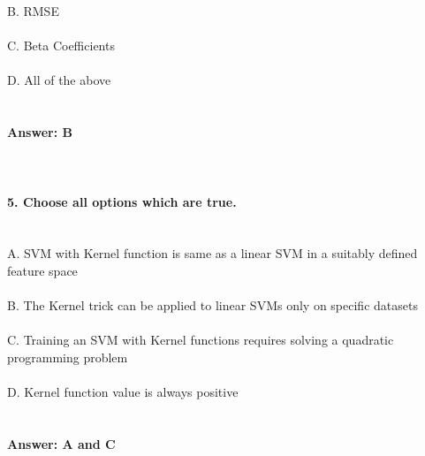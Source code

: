 \documentclass[prl,twocolumn,showpacs,preprintnumbers,superscriptaddress]{revtex4}
\theoremstyle{plain}
\theoremstyle{definition}
\begin{document}
\begin{widetext}
B. RMSE
\\
\\
C. Beta Coefficients
\\
\\
D. All of the above
\\
\\
\\
\textbf{Answer: B}
\\
\\
\\
\\
\textbf{5. Choose all options which are true.}
\\
\\
\\
\noindent A. SVM with Kernel function is same as a linear SVM in a suitably defined feature space
\\
\\
B. The Kernel trick can be applied to linear SVMs only on specific datasets
\\
\\
C. Training an SVM with Kernel functions requires solving a quadratic programming problem
\\
\\
D. Kernel function value is always positive
\\
\\
\\
\textbf{Answer: A and C}
\\
\\
\\
\end{widetext}
\end{document}

